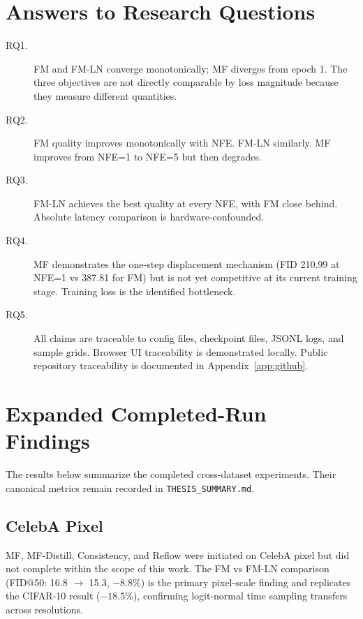 \section{Answers to Research Questions}

\begin{description}
  \item[RQ1.] FM and FM-LN converge monotonically; MF diverges from epoch 1.
              The three objectives are not directly comparable by loss magnitude
              because they measure different quantities.
  \item[RQ2.] FM quality improves monotonically with NFE. FM-LN similarly.
              MF improves from NFE=1 to NFE=5 but then degrades.
  \item[RQ3.] FM-LN achieves the best quality at every NFE, with FM close behind.
              Absolute latency comparison is hardware-confounded.
  \item[RQ4.] MF demonstrates the one-step displacement mechanism (FID 210.99
              at NFE=1 vs 387.81 for FM) but is not yet competitive at its
              current training stage. Training loss is the identified bottleneck.
  \item[RQ5.] All claims are traceable to config files, checkpoint files,
              JSONL logs, and sample grids. Browser UI traceability is
              demonstrated locally. Public repository traceability is documented
              in Appendix~\ref{app:github}.
\end{description}

\section{Expanded Completed-Run Findings}

The results below summarize the completed cross-dataset experiments. Their
canonical metrics remain recorded in \texttt{THESIS\_SUMMARY.md}.

\subsection{CelebA Pixel}

MF, MF-Distill, Consistency, and Reflow were initiated on CelebA pixel but did
not complete within the scope of this work. The FM vs FM-LN comparison
(FID@50: 16.8 $\rightarrow$ 15.3, $-8.8\%$) is the primary pixel-scale finding
and replicates the CIFAR-10 result ($-18.5\%$), confirming logit-normal time
sampling transfers across resolutions.

